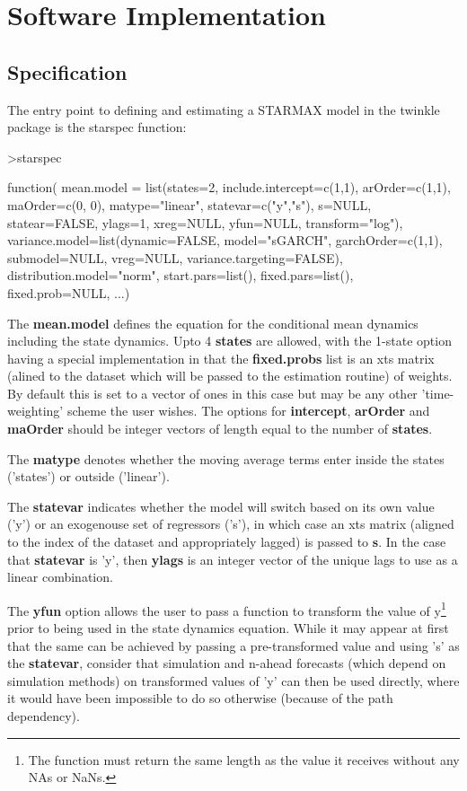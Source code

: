 \pagebreak
\section{Software Implementation}\label{sec:5}
\subsection{Specification}
The entry point to defining and estimating a STARMAX model in the twinkle
package is the starspec function:
\begin{Schunk}
\begin{Sinput}
>starspec
\end{Sinput}
\begin{Soutput}
function(
mean.model = list(states=2, include.intercept=c(1,1), arOrder=c(1,1), 
	maOrder=c(0, 0), matype="linear", statevar=c("y","s"), s=NULL, 
	statear=FALSE, ylags=1, xreg=NULL, yfun=NULL, transform="log"), 
variance.model=list(dynamic=FALSE, model="sGARCH", garchOrder=c(1,1), 
	submodel=NULL, vreg=NULL, variance.targeting=FALSE), 
distribution.model="norm", start.pars=list(), fixed.pars=list(), 
fixed.prob=NULL, ...)
\end{Soutput}
\end{Schunk}
The \textbf{mean.model} defines the equation for the conditional mean dynamics
including the state dynamics. Upto 4 \textbf{states} are allowed, with the
1-state option having a special implementation in that the \textbf{fixed.probs}
list is an xts matrix (alined to the dataset which will be passed to the
estimation routine) of weights. By default this is set to a vector of ones in
this case but may be any other 'time-weighting' scheme the user wishes. The
options for \textbf{intercept}, \textbf{arOrder} and \textbf{maOrder} should be
integer vectors of length equal to the number of \textbf{states}. 

The \textbf{matype} denotes whether the moving average terms enter inside the
states ('states') or outside ('linear'). 

The \textbf{statevar} indicates whether the model will switch based on its own
value ('y') or an exogenouse set of regressors ('s'), in which case an xts 
matrix (aligned to the index of the dataset and appropriately lagged) is passed 
to \textbf{s}. In the case that \textbf{statevar} is 'y', then \textbf{ylags} 
is an integer vector of the unique lags to use as a linear combination. 

The \textbf{yfun}  option allows the user to pass a function to transform the 
value of y\footnote{The function must return the same length as the value  it
receives without any NAs or NaNs.} prior to being used in the state dynamics 
equation. While it may appear at first that the same can be achieved by passing 
a pre-transformed value and using 's' as the \textbf{statevar}, consider that
simulation and n-ahead forecasts (which depend on simulation methods) on 
transformed values of 'y' can then be used directly, where it would have been
impossible to do so otherwise (because of the path dependency). 

